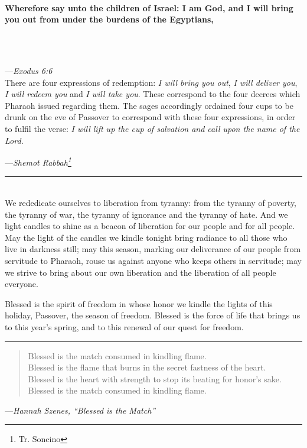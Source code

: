 \documentclass[a4paper,10pt,openany]{memoir}
\newcommand{\HgSource}[1]{\hfill{\small---\itshape{#1}}}
\newcommand{\HgHL}[1]{{\Large\bfseries#1\par\noindent\\[-.5em]}}
\newcommand{\HgFill}{\vfill \hrule \vfill}
\newenvironment{HgEnglish}{\strut\\\noindent}{\vspace{1em}}
\newcommand{\JSrc}{\textsuperscript{\upshape{[J]}}}
\newcommand{\SSrc}{\textsuperscript{\upshape{[S]}}}
\begin{document}
\begin{HgEnglish}
  \HgHL{
  Wherefore say unto the children of Israel: I am God, and I will bring you out
  from under the burdens of the Egyptians,}\\[-3em]

  \HgSource{Exodus 6:6 \JSrc}\\

  \noindent There are four expressions of redemption: {\itshape I will bring you
  out}, {\itshape I will deliver you}, {\itshape I will redeem you} and
  {\itshape I will take you}. These correspond to the four decrees which Pharaoh
  issued regarding them. The sages accordingly ordained four cups to be drunk on
  the eve of Passover to correspond with these four expressions, in order to
  fulfil the verse: {\itshape I will lift up the cup of salvation and call upon
  the name of the Lord.}

  \HgSource{Shemot Rabbah\footnote{Tr. Soncino}}
\end{HgEnglish}

\HgFill

\begin{HgEnglish}
  We rededicate ourselves to liberation from tyranny: from the tyranny of
  poverty, the tyranny of war, the tyranny of ignorance and the tyranny of hate.
  And we light candles to shine as a beacon of liberation for our people and for
  all people. May the light of the candles we kindle tonight bring radiance to
  all those who live in darkness still; may this season, marking our deliverance
  of our people from servitude to Pharaoh, rouse us against anyone who keeps
  others in servitude; may we strive to bring about our own liberation and the
  liberation of all people everyone.

  Blessed is the spirit of freedom in whose honor we kindle the lights of this
  holiday, Passover, the season of freedom. Blessed is the force of life that
  brings us to this year’s spring, and to this renewal of our quest for freedom.
  \SSrc
\end{HgEnglish}

\HgFill

\begin{verse}
  \small
  Blessed is the match consumed in kindling flame. \\
  Blessed is the flame that burns in the secret fastness of the heart. \\
  Blessed is the heart with strength to stop its beating for honor's sake. \\
  Blessed is the match consumed in kindling flame.
\end{verse}
\HgSource{Hannah Szenes, ``Blessed is the Match''}
\end{document}
